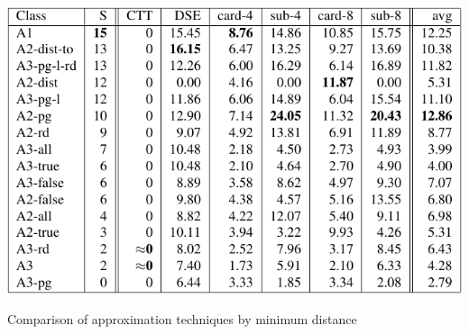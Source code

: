 \begin{table}[H]
\includegraphics[width=\textwidth]{tables/min_dist_comparison}
\caption{Comparison of approximation techniques by minimum distance}
\label{tab:min_dist_comparison}
\end{table}
